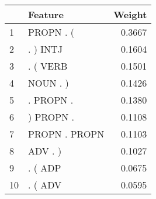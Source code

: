 \begin{tabular}{llr}
\toprule
{} &        Feature &  Weight \\
\midrule
1  &      PROPN . ( &  0.3667 \\
2  &       . ) INTJ &  0.1604 \\
3  &       . ( VERB &  0.1501 \\
4  &       NOUN . ) &  0.1426 \\
5  &      . PROPN . &  0.1380 \\
6  &      ) PROPN . &  0.1108 \\
7  &  PROPN . PROPN &  0.1103 \\
8  &        ADV . ) &  0.1027 \\
9  &        . ( ADP &  0.0675 \\
10 &        . ( ADV &  0.0595 \\
\bottomrule
\end{tabular}
